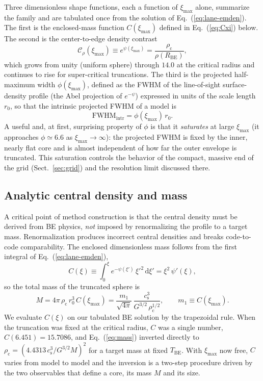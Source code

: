 \documentclass[11pt,a4paper]{article}
\newcommand{\rhoc}{\rho_{\mathrm{c}}}
\newcommand{\cs}{c_{\mathrm{s}}}
\newcommand{\rzero}{r_{0}}
\newcommand{\Rbe}{R_{\mathrm{BE}}}
\newcommand{\Tbe}{T_{\mathrm{BE}}}
\newcommand{\ximax}{\xi_{\mathrm{max}}}
\begin{document}
Three dimensionless shape functions, each a function of $\ximax$ alone,
summarize the family and are tabulated once from the solution of
Eq.~(\ref{eq:lane-emden}). The first is the enclosed-mass function $C(\ximax)$
defined in Eq.~(\ref{eq:Cxi}) below. The second is the center-to-edge density
contrast
\begin{equation}
  \mathcal{C}_{\rho}(\ximax) \equiv e^{\psi(\ximax)}
  = \frac{\rhoc}{\rho(\Rbe)} ,
  \label{eq:contrast}
\end{equation}
which grows from unity (uniform sphere) through $14.0$ at the critical radius
and continues to rise for super-critical truncations. The third is the
projected half-maximum width $\phi(\ximax)$, defined as the FWHM of the
line-of-sight surface-density profile (the Abel projection of $e^{-\psi}$)
expressed in units of the scale length $\rzero$, so that the intrinsic
projected FWHM of a model is
\begin{equation}
  \mathrm{FWHM}_{\mathrm{intr}} = \phi(\ximax)\,\rzero .
  \label{eq:phidef}
\end{equation}
A useful and, at first, surprising property of $\phi$ is that it \emph{saturates}
at large $\ximax$ (it approaches $\phi \simeq 6.6$ as $\ximax \to \infty$): the
projected FWHM is fixed by the inner, nearly flat core and is almost
independent of how far the outer envelope is truncated. This saturation
controls the behavior of the compact, massive end of the grid
(Sect.~\ref{sec:grid}) and the resolution limit discussed there.

\subsection{Analytic central density and mass}
\label{sec:inversion}

A critical point of method construction is that the central density must be
derived from BE physics, \emph{not} imposed by renormalizing the profile to
a target mass. Renormalization produces incorrect central densities and
breaks code-to-code comparability. The enclosed dimensionless mass follows
from the first integral of Eq.~(\ref{eq:lane-emden}),
\begin{equation}
  C(\xi)\equiv\int_{0}^{\xi} e^{-\psi(\xi')}\,\xi'^{2}\,\mathrm{d}\xi'
  = \xi^{2}\,\psi'(\xi),
  \label{eq:Cxi}
\end{equation}
so the total mass of the truncated sphere is
\begin{equation}
  M = 4\pi\,\rhoc\,\rzero^{3}\,C(\ximax)
    = \frac{m_{1}}{\sqrt{4\pi}}\,
      \frac{\cs^{3}}{G^{3/2}\,\rhoc^{1/2}},
  \qquad
  m_{1}\equiv C(\ximax).
  \label{eq:mass}
\end{equation}
We evaluate $C(\xi)$ on our tabulated BE solution by the trapezoidal rule.
When the truncation was fixed at the critical radius, $C$ was a single number,
$C(6.451)=15.7086$, and Eq.~(\ref{eq:mass}) inverted directly to
$\rhoc=(4.4313\,\cs^{3}/G^{3/2}M)^{2}$ for a target mass at fixed $\Tbe$. With
$\ximax$ now free, $C$ varies from model to model and the inversion is a
two-step procedure driven by the two observables that define a core, its mass
$M$ and its size.
\end{document}

